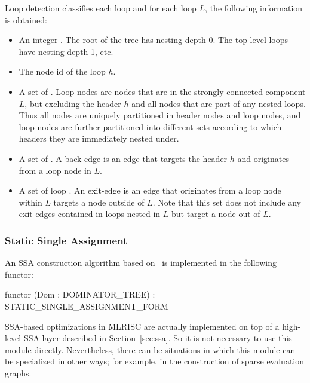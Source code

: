 Loop detection classifies each loop and for 
each loop $L$, the following information is obtained:
\begin{itemize}
 \item An integer .   The root of the tree has nesting
 depth 0.  The top level loops have nesting depth 1, etc.
 \item The node id of the loop  $h$.
 \item A set of .  Loop nodes are
  nodes that are in the strongly connected
  component $L$, but excluding the header $h$ 
  and all nodes that are part of any nested loops.
   Thus all nodes are uniquely partitioned in header nodes and
   loop nodes, and loop nodes are further partitioned into different
   sets according to which headers they are immediately nested under.
 \item A set of .  A back-edge is an
    edge that targets the header $h$ and originates from a loop node
    in $L$.
 \item A set of loop . An exit-edge is an edge
   that originates from a loop node within $L$
   targets a node outside of $L$.  Note that this set does not include
   any exit-edges contained in loops nested in $L$ but 
   target a node out of $L$.
\end{itemize}

\subsubsection{Static Single Assignment}

An SSA construction algorithm based on~\cite{SSA,Briggs-SSA,linear-time-IDF}
is implemented in the following functor:
\begin{SML}
  functor 
     (Dom : DOMINATOR_TREE) : STATIC_SINGLE_ASSIGNMENT_FORM
\end{SML}

SSA-based optimizations in MLRISC
are actually implemented on top of a
high-level SSA layer described in Section~\ref{sec:ssa}. 
So it is not necessary to use this module directly.  Nevertheless,
there can be situations in which this module can be specialized in other
ways; for example, in the construction of sparse evaluation graphs.

